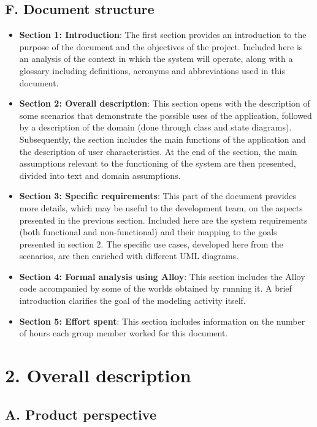\section{F. Document structure}

\begin{itemize}
\item
  \textbf{Section 1: Introduction}: The first section provides an introduction to the purpose of the document and the objectives of the project. Included here is an analysis of the context in which the system will operate, along with a glossary including definitions, acronyms and abbreviations used in this document.
\item
  \textbf{Section 2: Overall description}: This section opens with the description of some scenarios that demonstrate the possible uses of the application, followed by a description of the domain (done through class and state diagrams). Subsequently, the section includes the main functions of the application and the description of user characteristics. At the end of the section, the main assumptions relevant to the functioning of the system are then presented, divided into text and domain assumptions.
\item
  \textbf{Section 3: Specific requirements}: This part of the document provides more details, which may be useful to the development team, on the aspects presented in the previous section. Included here are the system requirements (both functional and non-functional) and their mapping to the goals presented in section 2. The specific use cases, developed here from the scenarios, are then enriched with different UML diagrams.
\item
  \textbf{Section 4: Formal analysis using Alloy}: This section includes the Alloy code accompanied by some of the worlds obtained by running it. A brief introduction clarifies the goal of the modeling activity itself.
\item
  \textbf{Section 5: Effort spent}: This section includes information on the number of hours each group member worked for this document.
\end{itemize}

\chapter{2. Overall description}

\section{A. Product perspective}

